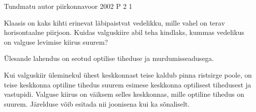 {Tundmatu autor} %
{piirkonnavoor} %
{2002} %
{P 2} %
{1} %
{
\ifStatement
Klaasis on kaks kihti erinevat läbipaistvat vedelikku, mille vahel on terav horisontaalne piirjoon. Kuidas valguskiire abil teha kindlaks, kummas vedelikus on valguse levimise kiirus suurem?
\fi

\ifHint
Ülesande lahendus on seotud optilise tiheduse ja murdumisseadusega.
\fi

\ifSolution
Kui valguskiir üleminekul ühest keskkonnast teise kaldub pinna ristsirge poole, on teise keskkonna optiline tihedus suurem esimese keskkonna optilisest tihedusest ja vastupidi. Valguse kiirus on väiksem selles keskkonnas, mille optiline tihedus on suurem. Järelduse võib esitada nii joonisena kui ka sõnaliselt.
\fi
}
 
 

